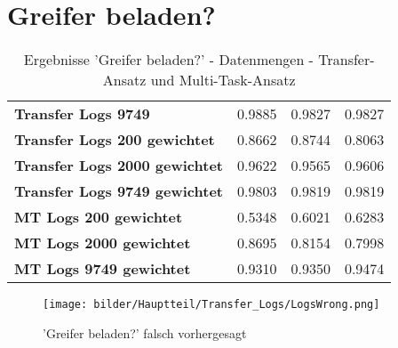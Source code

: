 \chapter{Greifer beladen?}
\label{appendix:BaumstammImGreifer}

	
	\begin{table}[ht]
	\centering
	\begin{tabularx}{\textwidth}{llll}
	\rowcolor{Gray}	\textbf{Transfer Logs 9749} 			& 0.9885 & 0.9827 & 0.9827	\\ 
		\textbf{Transfer Logs 200 gewichtet}	& 0.8662 & 0.8744 & 0.8063 	\\		
		\textbf{Transfer Logs 2000 gewichtet}	& 0.9622 & 0.9565 & 0.9606  \\	
		\textbf{Transfer Logs 9749 gewichtet}	& 0.9803 & 0.9819 & 0.9819	\\	
		\textbf{MT Logs 200 gewichtet}	 	    & 0.5348 & 0.6021 & 0.6283 	\\		
		\textbf{MT Logs 2000 gewichtet}	 	    & 0.8695 & 0.8154 & 0.7998 	\\	
		\textbf{MT Logs 9749 gewichtet}	 	    & 0.9310 & 0.9350 & 0.9474  \\	
	\end{tabularx}
	\caption{Ergebnisse 'Greifer beladen?' - Datenmengen - Transfer-Ansatz und Multi-Task-Ansatz}
	\label{table:Ergebnisse_Transfer_Logs}
\end{table}


	\begin{figure}[h]
	\centering
	\texttt{[image: bilder/Hauptteil/Transfer\_Logs/LogsWrong.png]}
	\caption{'Greifer beladen?' falsch vorhergesagt}
	\label{img:LogsFalschVorhergesagt}
	\end{figure}